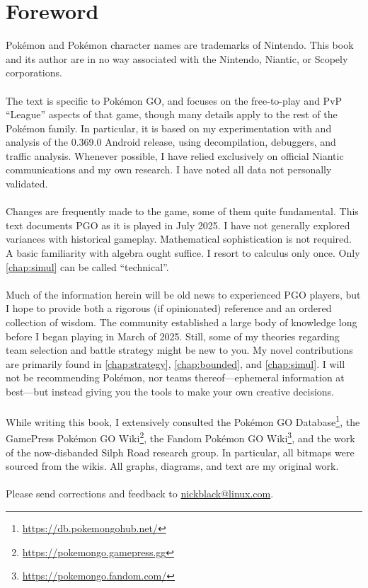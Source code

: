 \clearpage
\chapter{Foreword}

\noindent{}Pokémon and Pokémon character names are trademarks of Nintendo.
This book and its author are in no way associated with the Nintendo, Niantic,
  or Scopely corporations.\\
\\
\noindent{}The text is specific to Pokémon GO, and focuses on the free-to-play and PvP
  ``League'' aspects of that game, though many details
  apply to the rest of the Pokémon family.
In particular, it is based on my experimentation with and analysis of
 the 0.369.0 Android release, using decompilation, debuggers, and
 traffic analysis.
Whenever possible, I have relied exclusively on official Niantic communications
 and my own research.
I have noted all data not personally validated.\\
\\
\noindent{}Changes are frequently made to the game, some of them quite fundamental.
This text documents PGO as it is played in July 2025.
I have not generally explored variances with historical gameplay.
Mathematical sophistication is not required.
A basic familiarity with algebra ought suffice.
I resort to calculus only once.
Only \autoref{chap:simul} can be called ``technical''.\\
\\
\noindent{}Much of the information herein will be old news to experienced
 PGO players, but I hope to provide both a rigorous (if opinionated) reference and an ordered collection of wisdom.
The community established a large body of knowledge long before I
 began playing in March of 2025.
Still, some of my theories regarding team selection and battle strategy might
  be new to you.
My novel contributions are primarily found in \autoref{chap:strategy},
  \autoref{chap:bounded}, and \autoref{chap:simul}.
I will not be recommending Pokémon, nor teams thereof---ephemeral information at best---but
 instead giving you the tools to make your own creative decisions.\\
\\
\noindent{}While writing this book, I extensively consulted
  the Pokémon GO Database\footnote{\url{https://db.pokemongohub.net/}},
  the GamePress Pokémon GO Wiki\footnote{\url{https://pokemongo.gamepress.gg}},
  the Fandom Pokémon GO Wiki\footnote{\url{https://pokemongo.fandom.com/}},
  and the work of the now-disbanded Silph Road research group.
In particular, all bitmaps were sourced from the wikis.
All graphs, diagrams, and text are my original work.\\
\\
\noindent{}Please send corrections and feedback to 
  \href{mailto:nickblack@linux.com}{nickblack@linux.com}.
